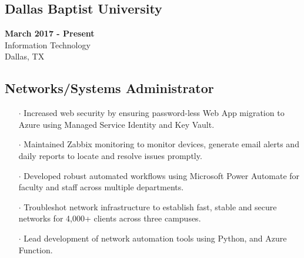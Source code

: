 \documentclass[10pt]{article}
\begin{document}
\begin{paracol}{2}
    \begin{leftcolumn} \vspace{-.4cm}
        \sloppy
        \subsection*{Dallas Baptist University}
        \textbf{March 2017 -  Present} \\
        Information Technology \\
        Dallas, TX
    \end{leftcolumn}

    \begin{rightcolumn} \vspace{-.36cm}
        \subsection*{Networks/Systems Administrator}
        \begin{itemize}[leftmargin=.28cm, itemsep=1pt]
            \item[$\cdot$] Increased web security by ensuring password-less Web App migration to Azure using Managed Service Identity and Key Vault.
            \item[$\cdot$] Maintained Zabbix monitoring to monitor devices, generate email alerts and daily reports to locate and resolve issues promptly.
            \item[$\cdot$] Developed robust automated workflows using Microsoft Power Automate for faculty and staff across multiple departments.
            \item[$\cdot$] Troubleshot network infrastructure to establish fast, stable and secure networks for 4,000+ clients across three campuses. 
            \item[$\cdot$] Lead development of network automation tools using Python, and Azure Function.
        \end{itemize}
    \end{rightcolumn}
\end{paracol}

\vspace{-.2cm}
\end{document}
